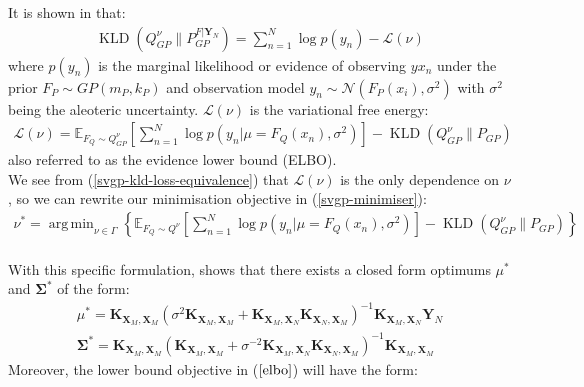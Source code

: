 \documentclass[twoside,11pt]{article}
\newcommand{\KLD}{\operatorname{KLD}}
\DeclareMathOperator*{\argmin}{arg\,min}
\begin{document}
It is shown in \cite{matthews2016sparse} that:
\begin{align}
    \KLD\left(Q_{GP}^{\nu} \Big\| P_{GP}^{F \vert \mathbf{Y}_N} \right) = \sum_{n=1}^N\log p(y_n) - \mathcal{L}(\nu)
    \label{svgp-kld-loss-equivalence}
\end{align}
where $p(y_n)$ is the marginal likelihood or evidence of observing $yx_n$ under the prior $F_P \sim GP(m_P, k_P)$ and observation model $y_n \sim \mathcal{N}(F_P(x_i), \sigma^2)$ with $\sigma^2$ being the aleoteric uncertainty. $\mathcal{L}(\nu)$ is the variational free energy:
\begin{align}
    \mathcal{L}(\nu) = \mathbb{E}_{F_Q \sim Q_{GP}^{\nu}}\left[\sum_{n=1}^{N}\log p\left(y_n \vert \mu=F_Q(x_n), \sigma^2\right)\right] -\KLD\left(Q^{\nu}_{GP}\Big\| P_{GP}\right) 
    \label{elbo}
\end{align}
also referred to as the evidence lower bound (ELBO). 
\\We see from (\ref{svgp-kld-loss-equivalence}) that $\mathcal{L}(\nu)$ is the only dependence on $\nu$, so we can rewrite our minimisation objective in (\ref{svgp-minimiser}):
\begin{align}
    \nu^* = \argmin_{\nu \in \Gamma} \left\{\mathbb{E}_{F_Q \sim Q^{\nu}}\left[\sum_{n=1}^{N}\log p\left(y_n \vert \mu=F_Q(x_n), \sigma^2\right)\right] -\KLD\left(Q^{\nu}_{GP}\Big\| P_{GP}\right)\right\}
    \label{svgp-minimiser-gvi-kld}
\end{align}
\\With this specific formulation, \cite{titsias2009variational} shows that there exists a closed form optimums $\mu^*$ and $\mathbf{\Sigma}^*$ of the form:
\begin{align}
    \label{svgp-optimal-mean}
    \mu^* = \mathbf{K}_{\mathbf{X}_M, \mathbf{X}_M} \left( \sigma^2 \mathbf{K}_{\mathbf{X}_M, \mathbf{X}_M} + \mathbf{K}_{\mathbf{X}_M, \mathbf{X}_N}\mathbf{K}_{\mathbf{X}_N, \mathbf{X}_M}\right)^{-1}\mathbf{K}_{\mathbf{X}_M, \mathbf{X}_N} \mathbf{Y}_N\\
    \label{svgp-optimal-covariance}
    \mathbf{\Sigma}^* = \mathbf{K}_{\mathbf{X}_M, \mathbf{X}_M} \left(\mathbf{K}_{\mathbf{X}_M, \mathbf{X}_M} +  \sigma^{-2}\mathbf{K}_{\mathbf{X}_M, \mathbf{X}_N}\mathbf{K}_{\mathbf{X}_N, \mathbf{X}_M}\right)^{-1}\mathbf{K}_{\mathbf{X}_M, \mathbf{X}_M}
\end{align}
Moreover, the lower bound objective in ($\ref{elbo}$) will have the form:
\end{document}
